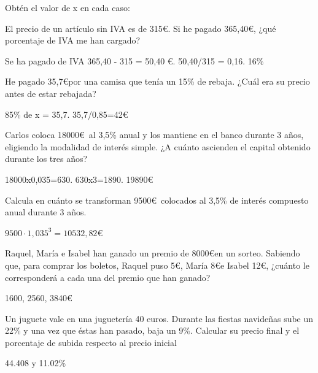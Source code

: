 \documentclass[addpoints,spanish, 12pt,a4paper]{exam}
\begin{document}
\begin{questions}

\question Obtén el valor de x en cada caso:
\addpoints


\question [2] El precio de un artículo sin IVA es de 315\euro. Si he pagado 365,40\euro, ¿qué porcentaje de IVA me han cargado?
\begin{solution}
Se ha pagado de IVA 365,40 - 315 = 50,40 \euro. 50,40/315 = 0,16. 16\%
\end{solution}

\question [2] He pagado 35,7\euro por una camisa que tenía un 15\% de rebaja. ¿Cuál era su precio antes de estar rebajada?
\begin{solution}
85\% de x = 35,7. 35,7/0,85=42\euro
\end{solution}

\question [2] Carlos coloca 18000\euro \   al 3,5\% anual y los mantiene en el banco durante 3 años, eligiendo la modalidad de interés simple. ¿A cuánto ascienden el capital obtenido durante los tres años?
\begin{solution}
18000x0,035=630. 630x3=1890. 19890\euro
\end{solution}


\question [2] Calcula en cuánto se transforman 9500\euro \ colocados al 3,5\% de interés compuesto anual durante 3 años.
\begin{solution}
$9500\cdot1,035^3=10532,82$\euro
\end{solution}

\question [2] Raquel, María e Isabel han ganado un premio de 8000\euro en un sorteo. Sabiendo que, para comprar los boletos, Raquel puso 5\euro, María 8\euro e Isabel 12\euro, ¿cuánto le corresponderá a cada una del premio que han ganado?
\begin{solution}
1600, 2560, 3840\euro
\end{solution}



\question [2] Un juguete vale en una juguetería 40 euros. Durante las fiestas navideñas sube un 22\% y una
vez que éstas han pasado, baja un 9\%. Calcular su precio final y el porcentaje de subida
respecto al precio inicial
\begin{solution}
44.408 y 11.02\%
\end{solution}


\addpoints

\end{questions}
\end{document}
